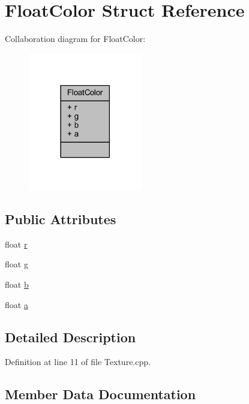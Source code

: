 \hypertarget{struct_float_color}{}\section{Float\+Color Struct Reference}
\label{struct_float_color}


Collaboration diagram for Float\+Color\+:\nopagebreak
\begin{figure}[H]
\begin{center}
\leavevmode
\includegraphics[width=141pt]{struct_float_color__coll__graph}
\end{center}
\end{figure}
\subsection*{Public Attributes}
\begin{DoxyCompactItemize}
\item 
float \hyperlink{struct_float_color_a5bb450f1e1a855b6bf50b436e078252b}{r}
\item 
float \hyperlink{struct_float_color_add6d6df001ec5ccc130b5abfcc820ee5}{g}
\item 
float \hyperlink{struct_float_color_afb5d780447f83234de2518a3faebc401}{b}
\item 
float \hyperlink{struct_float_color_a3e01752ebeb65af08f7f554551d6323a}{a}
\end{DoxyCompactItemize}


\subsection{Detailed Description}


Definition at line 11 of file Texture.\+cpp.



\subsection{Member Data Documentation}
